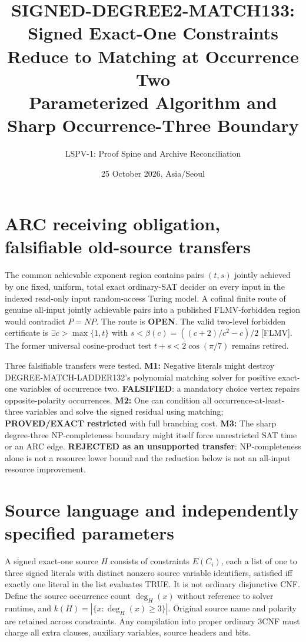\documentclass[11pt]{article}
\title{SIGNED-DEGREE2-MATCH133: Signed Exact-One Constraints Reduce to Matching at Occurrence Two\\ \large Parameterized Algorithm and Sharp Occurrence-Three Boundary}
\author{LSPV-1: Proof Spine and Archive Reconciliation}
\date{25 October 2026, Asia/Seoul}
\begin{document}
\maketitle
\begin{center}\end{center}

\section{ARC receiving obligation, falsifiable old-source transfers}
The common achievable exponent region contains pairs $(t,s)$ jointly achieved by one fixed, uniform, total exact ordinary-SAT decider on every input in the indexed read-only input random-access Turing model. A cofinal finite route of genuine all-input jointly achievable pairs into a published FLMV-forbidden region would contradict $P=NP$. The route is \textbf{OPEN}. The valid two-level forbidden certificate is $\exists c>\max\{1,t\}$ with $s<\beta(c)=((c+2)/c^2-c)/2$ [FLMV]. The former universal cosine-product test $t+s<2\cos(\pi/7)$ remains retired.

Three falsifiable transfers were tested. \textbf{M1:} Negative literals might destroy DEGREE-MATCH-LADDER132's polynomial matching solver for positive exact-one variables of occurrence two. \textbf{FALSIFIED}: a mandatory choice vertex repairs opposite-polarity occurrences. \textbf{M2:} One can condition all occurrence-at-least-three variables and solve the signed residual using matching; \textbf{PROVED/EXACT restricted} with full branching cost. \textbf{M3:} The sharp degree-three NP-completeness boundary might itself force unrestricted SAT time or an ARC edge. \textbf{REJECTED as an unsupported transfer}: NP-completeness alone is not a resource lower bound and the reduction below is not an all-input resource improvement.

\section{Source language and independently specified parameters}
A signed exact-one source $H$ consists of constraints $E(C_i)$, each a list of one to three signed literals with distinct nonzero source variable identifiers, satisfied iff exactly one literal in the list evaluates TRUE. It is not ordinary disjunctive CNF. Define the source occurrence count $\deg_H(x)$ without reference to solver runtime, and $k(H)=|\{x:\deg_H(x)\ge3\}|$. Original source name and polarity are retained across constraints. Any compilation into proper ordinary 3CNF must charge all extra clauses, auxiliary variables, source headers and bits.
\end{document}
